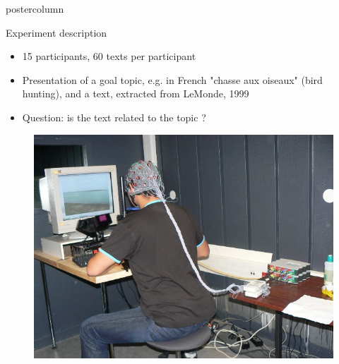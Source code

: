 \documentclass[final,hyperref={pdfpagelabels=false}]{beamer}
\newlength{\columnheight}
\begin{document}
\begin{frame}
  \begin{columns}
    \begin{column}{.50\textwidth}
      \begin{beamercolorbox}[center,wd=\textwidth]{postercolumn}
        \begin{minipage}[T]{.98\textwidth}  %
          \parbox[t][\columnheight]{\textwidth}{ %
            \begin{block}{Experiment description}
                \begin{itemize}
                    \item[\bullet] 15 participants, 60 texts per participant
                    \item[\bullet] Presentation of a goal topic, e.g. in French "chasse aux oiseaux" (bird hunting), and a text, extracted from LeMonde, 1999
                    \item[\bullet] Question: is the text related to the topic ?
                \end{itemize}
                \begin{minipage}{0.32\textwidth}
                    \begin{figure}[h]
                        \centering
                        \includegraphics[width=15cm]{efrp.jpg}

\end{figure}
\end{minipage}
\end{block}}
\end{minipage}
\end{beamercolorbox}
\end{column}
\end{columns}
\end{frame}
\end{document}
